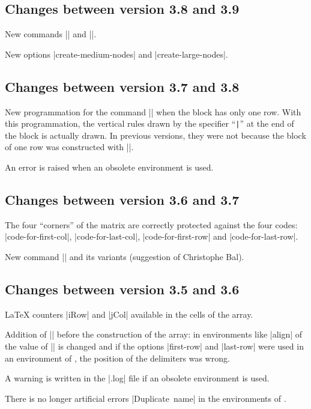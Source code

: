 \documentclass[dvipsnames]{article}%
\begin{document}
\subsection*{Changes between version 3.8 and 3.9} 

New commands |\NiceMatrixLastEnv| and |\OnlyMainNiceMatrix|.

New options |create-medium-nodes| and |create-large-nodes|.

\subsection*{Changes between version 3.7 and 3.8} 

New programmation for the command |\Block| when the block has only one row. 
With this programmation, the vertical rules drawn by the specifier
``\verb+|+'' at the end of the block is actually drawn. In previous versions,
they were not because the block of one row was constructed with
|\multicolumn|. 

An error is raised when an obsolete environment is used.

\subsection*{Changes between version 3.6 and 3.7} 

The four ``corners'' of the matrix are correctly protected against the four
codes: |code-for-first-col|, |code-for-last-col|, |code-for-first-row| and
|code-for-last-row|. 

New command |\pAutoNiceMatrix| and its variants (suggestion of Christophe
Bal).

\subsection*{Changes between version 3.5 and 3.6} 

LaTeX counters |iRow| and |jCol| available in the cells of the array.

Addition of |\normalbaselines| before the construction of the array: in
environments like |{align}| of  the value of |\baselineskip| is
changed and if the options |first-row| and |last-row| were used in an
environment of , the position of the delimiters was wrong.

A warning is written in the |.log| file if an obsolete environment is used.

There is no longer artificial errors |Duplicate~name| in the environments of
. 
\end{document}
